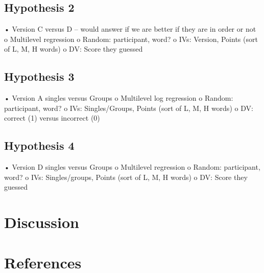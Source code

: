 \documentclass[man]{apa6}
\theoremstyle{definition}
\theoremstyle{definition}
\theoremstyle{definition}
\theoremstyle{remark}
\begin{document}
\subsection{Hypothesis 2}\label{hypothesis-2}

• Version C versus D -- would answer if we are better if they are in
order or not o Multilevel regression o Random: participant, word? o IVs:
Version, Points (sort of L, M, H words) o DV: Score they guessed

\subsection{Hypothesis 3}\label{hypothesis-3}

• Version A singles versus Groups o Multilevel log regression o Random:
participant, word? o IVs: Singles/Groups, Points (sort of L, M, H words)
o DV: correct (1) versus incorrect (0)

\subsection{Hypothesis 4}\label{hypothesis-4}

• Version D singles versus Groups o Multilevel regression o Random:
participant, word? o IVs: Singles/groups, Points (sort of L, M, H words)
o DV: Score they guessed

\section{Discussion}\label{discussion}

\newpage

\section{References}\label{references}

\begingroup
\setlength{\parindent}{-0.5in} \setlength{\leftskip}{0.5in}

\hypertarget{refs}{}

\endgroup
\end{document}
